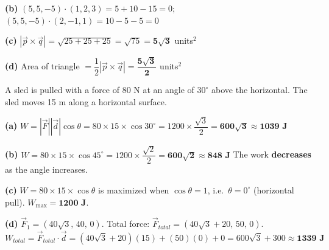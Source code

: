 \documentclass[addpoints]{exam}
\begin{document}
\begin{questions}
\begin{solution}[9cm]
\textbf{(b)}
$(5,5,-5)\cdot(1,2,3) = 5+10-15 = 0$\checkmark;\quad
$(5,5,-5)\cdot(2,-1,1) = 10-5-5 = 0$\checkmark

\textbf{(c)} $|\vec{p}\times\vec{q}| = \sqrt{25+25+25} = \sqrt{75} = \mathbf{5\sqrt{3}}$ units$^2$

\textbf{(d)} Area of triangle $= \dfrac{1}{2}|\vec{p}\times\vec{q}| = \mathbf{\dfrac{5\sqrt{3}}{2}}$ units$^2$
\end{solution}

\question A sled is pulled with a force of 80 N at an angle of $30^\circ$ above the horizontal.
The sled moves 15 m along a horizontal surface.
\begin{solution}[9cm]
\textbf{(a)} $W = |\vec{F}||\vec{d}|\cos\theta = 80 \times 15 \times \cos30^\circ
= 1200 \times \dfrac{\sqrt{3}}{2} = \mathbf{600\sqrt{3} \approx 1039 \text{ J}}$

\textbf{(b)} $W = 80 \times 15 \times \cos45^\circ = 1200 \times \dfrac{\sqrt{2}}{2}
= \mathbf{600\sqrt{2} \approx 848 \text{ J}}$
The work \textbf{decreases} as the angle increases.

\textbf{(c)} $W = 80 \times 15 \times \cos\theta$ is maximized when $\cos\theta = 1$,
i.e.\ $\theta = 0^\circ$ (horizontal pull).
$W_{\max} = \mathbf{1200 \text{ J}}$.

\textbf{(d)} $\vec{F}_1 = (40\sqrt{3},\,40,\,0)$.
Total force: $\vec{F}_{total} = (40\sqrt{3}+20,\,50,\,0)$.
\[
W_{total} = \vec{F}_{total}\cdot\vec{d} = (40\sqrt{3}+20)(15) + (50)(0) + 0
= 600\sqrt{3} + 300 \approx \mathbf{1339 \text{ J}}
\]
\end{solution}

\end{questions}
\end{document}
